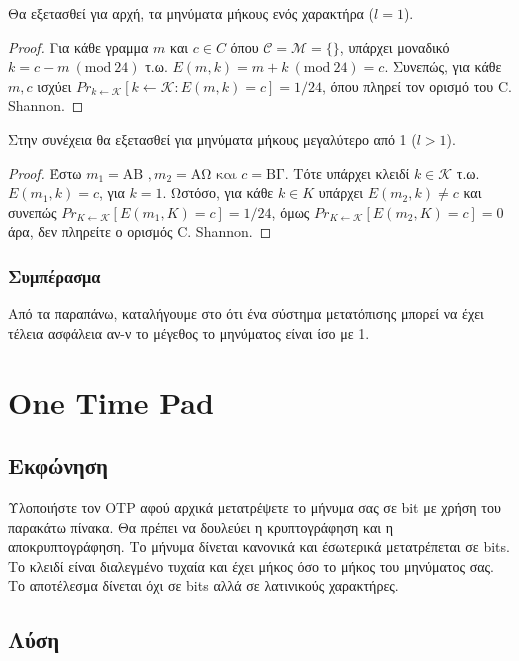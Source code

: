 \documentclass[oneside]{article}
\newcommand{\Mod}[1]{\ (\mathrm{mod}\ #1)}
\begin{document}
Θα εξετασθεί για αρχή, τα μηνύματα μήκους ενός χαρακτήρα ($l = 1$). 

\begin{proof}
    Για κάθε γραμμα $m$ και $c \in C$ όπου $\mathcal{C} = \mathcal{M} = \{$$\}$, υπάρχει μοναδικό $k = c - m \Mod{24}$ τ.ω. $E(m, k) = m + k \Mod{24} = c$. Συνεπώς, για κάθε $m, c$ ισχύει $Pr_{k \leftarrow \mathcal{K}}[k \leftarrow \mathcal{K}: E(m, k) = c] = 1/24$, όπου πληρεί τον ορισμό του C. Shannon.
\end{proof}

Στην συνέχεια θα εξετασθεί για μηνύματα μήκους μεγαλύτερο από 1 ($l > 1$). 

\begin{proof}
    Έστω $m_1 = \text{ΑΒ }, m_2 = \text{ΑΩ και } c = \text{ΒΓ}$. Τότε υπάρχει κλειδί $k \in \mathcal{K}$ τ.ω. $E(m_1, k) = c$, για $k = 1$. Ωστόσο, για κάθε $k \in K$ υπάρχει $E(m_2, k) \neq c$ και συνεπώς $Pr_{K \leftarrow \mathcal{K}}[E(m_1, K) = c] = 1/24$, όμως $Pr_{K \leftarrow \mathcal{K}}[E(m_2, K) = c] = 0$ άρα, δεν πληρείτε ο ορισμός C. Shannon.
\end{proof}

\subsubsection{Συμπέρασμα}

Από τα παραπάνω, καταλήγουμε στο ότι ένα σύστημα μετατόπισης μπορεί να έχει τέλεια ασφάλεια αν-ν το μέγεθος το μηνύματος είναι ίσο με 1.

\section{One Time Pad}

\subsection{Εκφώνηση}

Υλοποιήστε τον OTP αφού αρχικά μετατρέψετε το μήνυμα σας σε bit με χρήση του παρακάτω πίνακα. Θα πρέπει να δουλεύει η κρυπτογράφηση και η αποκρυπτογράφηση. Το μήνυμα δίνεται κανονικά και έσωτερικά μετατρέπεται σε bits. Το κλειδί είναι διαλεγμένο τυχαία και έχει μήκος όσο το μήκος του μηνύματος σας. Το αποτέλεσμα δίνεται όχι σε bits αλλά σε λατινικούς χαρακτήρες.

\subsection{Λύση} 
\end{document}
